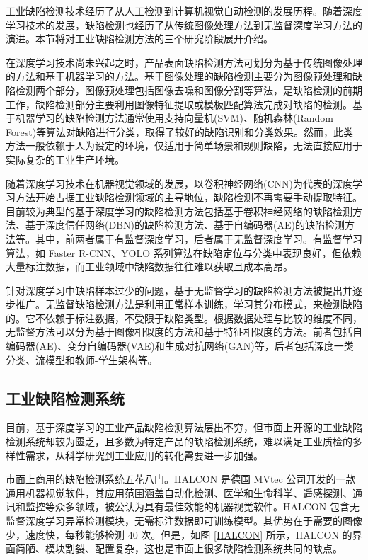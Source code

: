 \documentclass[
  ]{njuthesis}
\begin{document}
工业缺陷检测技术经历了从人工检测到计算机视觉自动检测的发展历程。随着深度学习技术的发展，缺陷检测也经历了从传统图像处理方法到无监督深度学习方法的演进。本节将对工业缺陷检测方法的三个研究阶段展开介绍。

在深度学习技术尚未兴起之时，产品表面缺陷检测方法可划分为基于传统图像处理的方法和基于机器学习的方法\cite{[8]}。基于图像处理的缺陷检测主要分为图像预处理和缺陷检测两个部分，图像预处理包括图像去噪和图像分割等算法，是缺陷检测的前期工作，缺陷检测部分主要利用图像特征提取或模板匹配算法完成对缺陷的检测\cite{[6]}。基于机器学习的缺陷检测方法通常使用支持向量机(SVM)、随机森林(Random Forest)等算法对缺陷进行分类，取得了较好的缺陷识别和分类效果。然而，此类方法一般依赖于人为设定的环境，仅适用于简单场景和规则缺陷，无法直接应用于实际复杂的工业生产环境。

随着深度学习技术在机器视觉领域的发展，以卷积神经网络(CNN)为代表的深度学习方法开始占据工业缺陷检测领域的主导地位，缺陷检测不再需要手动提取特征。目前较为典型的基于深度学习的缺陷检测方法包括基于卷积神经网络的缺陷检测方法、基于深度信任网络(DBN)的缺陷检测方法、基于自编码器(AE)的缺陷检测方法等。其中，前两者属于有监督深度学习，后者属于无监督深度学习\cite{[6]}。有监督学习算法，如 Faster R-CNN、YOLO 系列算法在缺陷定位与分类中表现良好，但依赖大量标注数据，而工业领域中缺陷数据往往难以获取且成本高昂。

针对深度学习中缺陷样本过少的问题，基于无监督学习的缺陷检测方法被提出并逐步推广。无监督缺陷检测方法是利用正常样本训练，学习其分布模式，来检测缺陷的。它不依赖于标注数据，不受限于缺陷类型。根据数据处理与比较的维度不同，无监督方法可以分为基于图像相似度的方法和基于特征相似度的方法。前者包括自编码器(AE)、变分自编码器(VAE)和生成对抗网络(GAN)等，后者包括深度一类分类、流模型和教师-学生架构等\cite{[1]}。

\subsection{工业缺陷检测系统}

目前，基于深度学习的工业产品缺陷检测算法层出不穷，但市面上开源的工业缺陷检测系统却较为匮乏，且多数为特定产品的缺陷检测系统，难以满足工业质检的多样性需求，从科学研究到工业应用的转化需要进一步加强。

市面上商用的缺陷检测系统五花八门。HALCON 是德国 MVtec 公司开发的一款通用机器视觉软件，其应用范围涵盖自动化检测、医学和生命科学、遥感探测、通讯和监控等众多领域，被公认为具有最佳效能的机器视觉软件。HALCON 包含无监督深度学习异常检测模块，无需标注数据即可训练模型。其优势在于需要的图像少，速度快，每秒能够检测 40 次。但是，如图 \ref{HALCON} 所示，HALCON 的界面简陋、模块割裂、配置复杂，这也是市面上很多缺陷检测系统共同的缺点。
\end{document}

